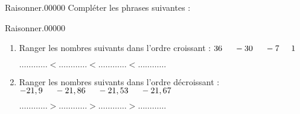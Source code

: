 \documentclass[a4paper,dvipsnames,french,10pt]{book}
\begin{document}
\begin{pageParcoursu} %

\begin{ExoCuN}{Raisonner.}{0}{0}{0}{0}{0}
Compléter les phrases suivantes :


\end{ExoCuN}

\begin{ExoCuN}{Raisonner.}{0}{0}{0}{0}{0}
\begin{enumerate}
 \item Ranger les nombres suivants dans l'ordre croissant : $36 \hspace{.5cm} -30 \hspace{.5cm} -7 \hspace{.5cm} 1$ \vspace{.2cm}

\begin{center}
$\ldots\ldots\ldots\ldots<\ldots\ldots\ldots\ldots<\ldots\ldots\ldots
\ldots<\ldots\ldots\ldots\ldots$
\end{center}


 \item Ranger les nombres suivants dans l'ordre décroissant : $-21,9 \hspace{.5cm} -21,86 \hspace{.5cm} -21,53 \hspace{.5cm} -21,67$ \vspace{.2cm}
 
\begin{center}
$\ldots\ldots\ldots\ldots>\ldots\ldots\ldots\ldots>\ldots\ldots\ldots
\ldots>\ldots\ldots\ldots\ldots$
\end{center}


\end{enumerate}
\end{ExoCuN}
\end{pageParcoursu}
\end{document}
